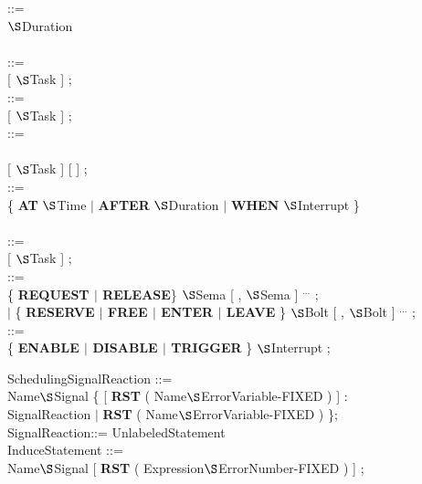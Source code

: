 ::=\\
 $\S $Duration\\
\\

 ::=\\
 [ $\S $Task ] ; \\

 ::=\\
 [ $\S $Task ] ;\\

 ::=\\
\\
 [ $\S $Task ] [  ] ;\\

 ::=\\
\x \{ {\bf AT} $\S $Time $\mid$ {\bf AFTER} $\S $Duration $\mid$ {\bf WHEN} $\S $Interrupt \}\\
\\        

 ::=\\
 [ $\S $Task ] ;\\

 ::=\\
\x \{ {\bf REQUEST $\mid$ RELEASE}\} $\S $Sema [ , $\S $Sema ] $^{...}$ ;\\
\x $\mid$ \{ {\bf RESERVE $\mid$ FREE $\mid$ ENTER $\mid$ LEAVE} \} $\S $Bolt [ , $\S $Bolt ] $^{...}$ ;\\


 ::=\\
\x \{ {\bf ENABLE $\mid$ DISABLE $\mid$ TRIGGER} \} $\S $Interrupt ;\\

\begin{removed}
SchedulingSignalReaction ::=\\
 Name$\S $Signal \{ [ {\bf RST} ( Name$\S $ErrorVariable-FIXED ) ] :\\
\x \x SignalReaction $\mid$ {\bf RST} ( Name$\S $ErrorVariable-FIXED ) \};\\

SignalReaction::= UnlabeledStatement\\

InduceStatement ::=\\
 Name$\S $Signal [ {\bf RST} ( Expression$\S $ErrorNumber-FIXED ) ] ;\\
\end{removed}

